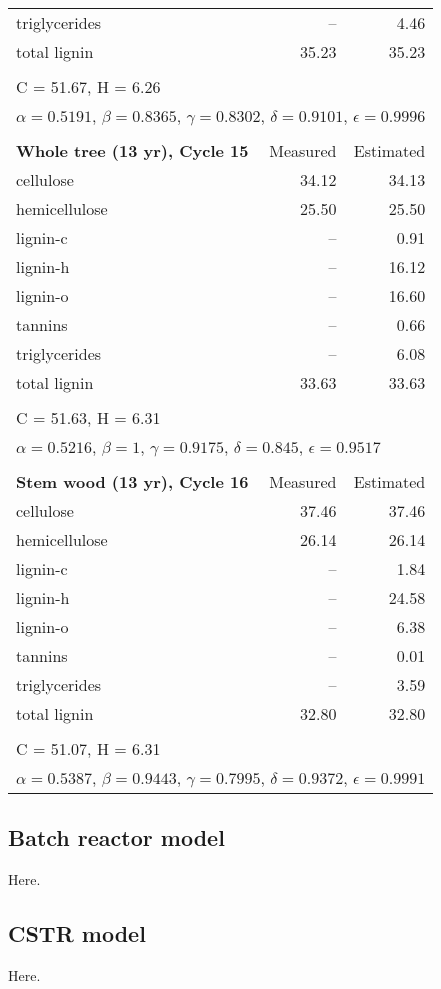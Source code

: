 \begin{longtable}{p{8cm}rr}
    triglycerides & --    & 4.46 \\
    total lignin  & 35.23 & 35.23 \\
    \\
    \multicolumn{3}{l}{C = 51.67, H = 6.26} \\
    \multicolumn{3}{l}{$\alpha = 0.5191$, $\beta = 0.8365$, $\gamma = 0.8302$, $\delta = 0.9101$, $\epsilon = 0.9996$} \\
    \\
    \textbf{Whole tree (13 yr), Cycle 15} & Measured & Estimated \\
    \midrule
    cellulose     & 34.12 & 34.13 \\
    hemicellulose & 25.50 & 25.50 \\
    lignin-c      & --    & 0.91 \\
    lignin-h      & --    & 16.12 \\
    lignin-o      & --    & 16.60 \\
    tannins       & --    & 0.66 \\
    triglycerides & --    & 6.08 \\
    total lignin  & 33.63 & 33.63 \\
    \\
    \multicolumn{3}{l}{C = 51.63, H = 6.31} \\
    \multicolumn{3}{l}{$\alpha = 0.5216$, $\beta = 1$, $\gamma = 0.9175$, $\delta = 0.845$, $\epsilon = 0.9517$} \\
    \\
    \textbf{Stem wood (13 yr), Cycle 16} & Measured & Estimated \\
    \midrule
    cellulose     & 37.46 & 37.46 \\
    hemicellulose & 26.14 & 26.14 \\
    lignin-c      & --    & 1.84 \\
    lignin-h      & --    & 24.58 \\
    lignin-o      & --    & 6.38 \\
    tannins       & --    & 0.01 \\
    triglycerides & --    & 3.59 \\
    total lignin  & 32.80 & 32.80 \\
    \\
    \multicolumn{3}{l}{C = 51.07, H = 6.31} \\
    \multicolumn{3}{l}{$\alpha = 0.5387$, $\beta = 0.9443$, $\gamma = 0.7995$, $\delta = 0.9372$, $\epsilon = 0.9991$} \\
\end{longtable}

\subsection{Batch reactor model}

Here.

\subsection{CSTR model}

Here.
